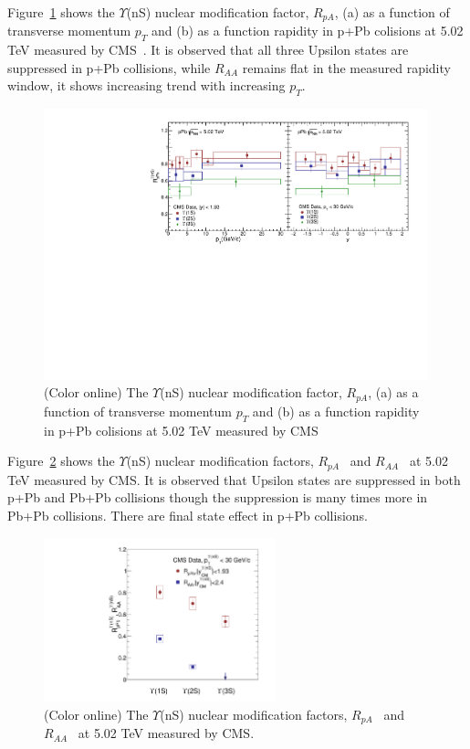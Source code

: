 Figure~\ref{fig:LHCpPb5} shows the $\Upsilon$(nS) nuclear modification factor, $R_{pA}$,
      (a) as a function of transverse momentum $p_{T}$
    and (b) as a function rapidity in p+Pb colisions at 5.02 TeV measured by CMS~\cite{CMS:2022wfi}.
    It is observed that all three Upsilon states are suppressed in p+Pb collisions, while
    $R_{AA}$ remains flat in the measured rapidity window, it shows increasing trend with
    increasing $p_T$.

\begin{figure}
  \includegraphics[width=0.99\textwidth]{Figures/Fig13_LHC_YnSRPPbPtRap.pdf}
     \caption{(Color online) The $\Upsilon$(nS) nuclear modification factor, $R_{pA}$,
      (a) as a function of transverse momentum $p_{T}$
    and (b) as a function rapidity in p+Pb colisions at 5.02 TeV measured by CMS~\cite{CMS:2022wfi}
  }
  \label{fig:LHCpPb5}
\end{figure}




Figure~\ref{fig:LHCpBPbPb} shows the $\Upsilon$(nS) nuclear modification factors,
    $R_{pA}$~\cite{CMS:2022wfi} and $R_{AA}$~\cite{CMS:2018zza}
 at 5.02 TeV measured by CMS.
 It is observed that Upsilon states are suppressed in both p+Pb and Pb+Pb collisions
 though the suppression is many times more in Pb+Pb collisions. There are
 final state effect in p+Pb collisions. 
    

\begin{figure}
\centering
  \includegraphics[width=0.60\textwidth]{Figures/Fig14_LHC_YnSRPPbRAAInt.pdf}
  \caption{(Color online) The $\Upsilon$(nS) nuclear modification factors,
    $R_{pA}$~\cite{CMS:2022wfi} and $R_{AA}$~\cite{CMS:2018zza}
    at 5.02 TeV measured by CMS.
  }
 \label{fig:LHCpBPbPb}
\end{figure}


